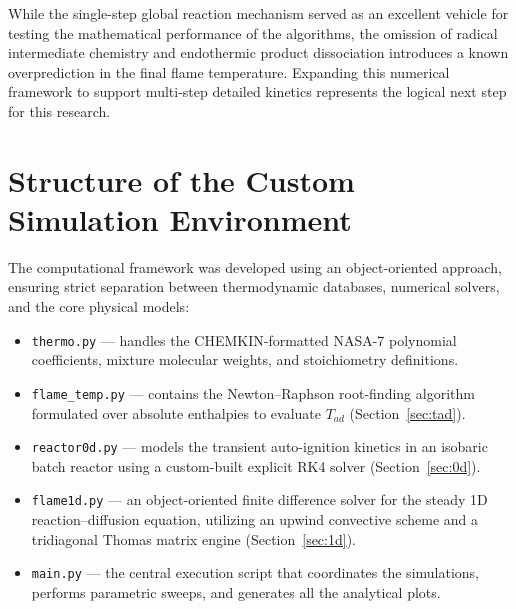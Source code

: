 \documentclass[11pt,a4paper]{article}
\begin{document}
While the single-step global reaction mechanism served as an excellent vehicle for testing the mathematical performance of the algorithms, the omission of radical intermediate chemistry and endothermic product dissociation introduces a known overprediction in the final flame temperature. Expanding this numerical framework to support multi-step detailed kinetics represents the logical next step for this research.


\appendix
\section{Structure of the Custom Simulation Environment}
\label{app:kod}
The computational framework was developed using an object-oriented approach, ensuring strict separation between thermodynamic databases, numerical solvers, and the core physical models:
\begin{itemize}
  \item \texttt{thermo.py} --- handles the CHEMKIN-formatted NASA-7 polynomial coefficients, mixture molecular weights, and stoichiometry definitions.
  \item \texttt{flame\_temp.py} --- contains the Newton--Raphson root-finding algorithm formulated over absolute enthalpies to evaluate $T_{ad}$ (Section~\ref{sec:tad}).
  \item \texttt{reactor0d.py} --- models the transient auto-ignition kinetics in an isobaric batch reactor using a custom-built explicit RK4 solver (Section~\ref{sec:0d}).
  \item \texttt{flame1d.py} --- an object-oriented finite difference solver for the steady 1D reaction--diffusion equation, utilizing an upwind convective scheme and a tridiagonal Thomas matrix engine (Section~\ref{sec:1d}).
  \item \texttt{main.py} --- the central execution script that coordinates the simulations, performs parametric sweeps, and generates all the analytical plots.
\end{itemize}
\end{document}
